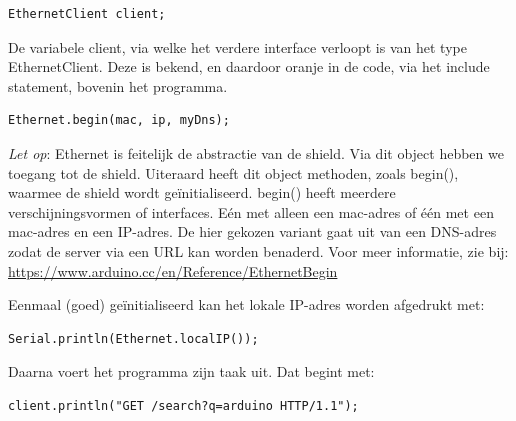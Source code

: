 \begin{lstlisting}[language=Arduino, numbers=none]
EthernetClient client;
\end{lstlisting}

De variabele client, via welke het verdere interface verloopt is van het type EthernetClient. Deze is bekend, en daardoor oranje in de code, via het include statement, bovenin het programma.

\begin{lstlisting}[language=Arduino, numbers=none]
Ethernet.begin(mac, ip, myDns);
\end{lstlisting}

\begin{remark}
\textit{Let op}: Ethernet is feitelijk de abstractie van de shield. Via dit object hebben we toegang tot de shield. Uiteraard heeft dit object methoden, zoals begin(), waarmee de shield wordt geïnitialiseerd. begin() heeft meerdere verschijningsvormen of interfaces. Eén met alleen een mac-adres of één met een mac-adres en een IP-adres. De hier gekozen variant gaat uit van een DNS-adres zodat de server via een URL kan worden benaderd. Voor meer informatie, zie bij: \newline
\url{https://www.arduino.cc/en/Reference/EthernetBegin}
\end{remark}

Eenmaal (goed) geïnitialiseerd kan het lokale IP-adres worden afgedrukt met:

\begin{lstlisting}[language=Arduino, numbers=none]
Serial.println(Ethernet.localIP());
\end{lstlisting}

Daarna voert het programma zijn taak uit. Dat begint met:
\begin{lstlisting}[language=Arduino, numbers=none]
client.println("GET /search?q=arduino HTTP/1.1");
\end{lstlisting}

